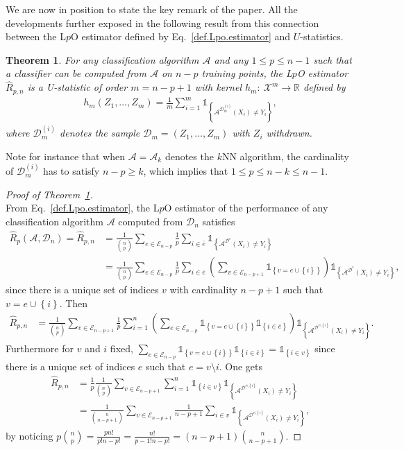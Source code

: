 \documentclass[twoside,11pt]{article}
\numberwithin{equation}{section}
\newcommand{\1}{\mathds{1}}%
\newcommand{\paren}[1]{\left( #1 \right)}
\newcommand{\acc}[1]{\left\{ #1 \right\}}
\newcommand{\R}{\mathbb{R}}
\newcommand{\X}{\mathcal{X}}
\newcommand{\Rh}{\widehat{R}}
\newcommand{\D}{\mathcal{D}}
\newcommand{\De}{\mathcal{D}^e}
\newcommand{\A}{\mathcal{A}}
\newcommand{\Enp}{\mathcal{E}_{n-p}}
\numberwithin{equation}{section}
\theoremstyle{plain}
\newtheorem{thm}{Theorem}[section]
\begin{document}
We are now in position to state the key remark of the paper. All the developments further exposed in the following result from this connection between the L$p$O estimator defined by Eq.~\eqref{def.Lpo.estimator} and $U$-statistics.
%
\begin{thm}\label{theorem.lpo.ustat}
%
For any classification algorithm $\A$ and any $1\leq p \leq n-1$  {such that a classifier can be computed from $\A$ on $n-p$ training points}, the L$p$O estimator $\Rh_{p,n}$ is a U-statistic of order $m=n-p+1$ with kernel $h_m: \ \X^m \longrightarrow \R$ defined by
\begin{align*}
  h_m( Z_1,\ldots,Z_m ) = \frac{1}{m} \sum_{i=1}^m \1_{ \acc{\A^{ \D_m^{(i)} }( X_i) \neq Y_i } } ,
\end{align*}
where $\D_m^{(i)}$ denotes the sample $\D_m=(Z_1,\ldots,Z_m)$ with $Z_i$ withdrawn.
\end{thm}
%
 {Note for instance that when $\A = \A_k$ denotes the $k$NN algorithm, the cardinality of $\D_m^{(i)}$ has to satisfy $n-p \geq k$, which implies that $1\leq p \leq n-k\leq n-1$}.
%
\begin{proof}[Proof of Theorem~\ref{theorem.lpo.ustat}]
  ~\\


From Eq.~\eqref{def.Lpo.estimator}, the L$p$O estimator of the performance of any classification algorithm $\A$ computed from $\D_n$ satisfies
\begin{align*}
\Rh_p(\A,\D_n) = \Rh_{p,n} & = \frac{1}{{n\choose p}}\sum_{e\in \Enp} \frac{1}{p} \sum_{i\in\bar e} \1_{\acc{ \A^{\De}\paren{X_i} \neq Y_i }} \\
%
& = \frac{1}{{n\choose p}}\sum_{e\in\mathcal{E}_{n-p}} \frac{1}{p} \sum_{i\in\bar e} \paren{\sum_{v\in \mathcal{E}_{n-p+1}}\1_{\acc{ v = e\cup \acc{i}} }} \1_{\acc{ \A^{\De}\paren{X_i} \neq Y_i }} ,
\end{align*}
since there is a unique set of indices $v$ with cardinality $n-p+1$ such that $v= e\cup \acc{i}$.
%
Then
\begin{align*}
\Rh_{p,n}
& = \frac{1}{{n\choose p}}\sum_{v\in \mathcal{E}_{n-p+1}}  \frac{1}{p} \sum_{i=1}^n  \paren{ \sum_{e\in\mathcal{E}_{n-p}} \1_{\acc{ v = e\cup \acc{i}} }  \1_{\acc{i\in\bar e}} } \1_{\acc{ \A^{\D^{v\setminus \acc{i}}}\paren{ X_i} \neq Y_i }}.
\end{align*}
%
Furthermore for $v$ and $i$ fixed, $\sum_{e\in\mathcal{E}_{n-p}} \1_{\acc{ v = e\cup \acc{i}} }  \1_{\acc{i\in\bar e}} = \1_{\acc{ i\in v}}$ since there is a unique set of indices $e$ such that $e = v\setminus i$.
%
One gets
\begin{align*}
\Rh_{p,n}
& = \frac{1}{p}\frac{1}{{n\choose p}}\sum_{v\in \mathcal{E}_{n-p+1}}   \sum_{i=1}^n  \1_{\acc{ i\in v}} \1_{\acc{ \A^{\D^{v\setminus \acc{i}}}\paren{ X_i} \neq Y_i }} \\
%
& =  \frac{1}{{n\choose n-p+1}} \sum_{v\in \mathcal{E}_{n-p+1}}   \frac{1}{n-p+1} \sum_{i \in v} \1_{\acc{ \A^{\D^{v\setminus \acc{i}}}\paren{ X_i} \neq Y_i }},
\end{align*}
%
by noticing $p {n\choose p} = \frac{ p n!}{ p! n-p!} = \frac{ n!}{ p-1! n-p!} = (n-p+1) {n\choose n-p+1} .$

\end{proof}
\end{document}

